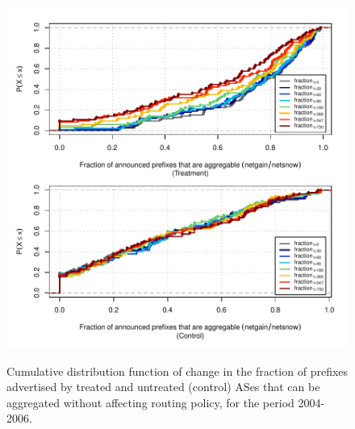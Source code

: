 \clearpage
\vspace*{16pt}
\begin{figure}[H]
\begin{centering}
\begin{singlespace}
\captionsetup{list=no}
    \includegraphics[width=6in]{figures/behavior-frac_deagg-2004_2006-corr.pdf}
    \vspace{-2em}\\
    \caption{Cumulative distribution function of change in the fraction of
    prefixes advertised by treated and untreated (control) ASes that can be
    aggregated without affecting routing policy, for the period 2004-2006.}
\end{singlespace}
\end{centering}
\end{figure}

